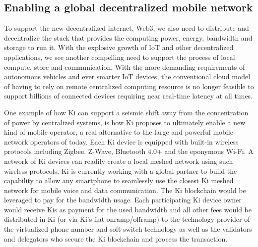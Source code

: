 \subsection{Enabling a global decentralized mobile network}
\label{sec:kiecosystemmobile}
To support the new decentralized internet, Web3, we also need to distribute and decentralize the stack that provides the computing power, energy, bandwidth and storage to run it. With the explosive growth of IoT and other decentralized applications, we see another compelling need to support the process of local compute, store and communication. With the more demanding requirements of autonomous vehicles and ever smarter IoT devices, the conventional cloud model of having to rely on remote centralized computing resource is no longer feasible to support billions of connected devices requiring near real-time latency at all times.

One example of how Ki can support a seismic shift away from the concentration of power by centralized systems, is how Ki proposes to ultimately enable a new kind of mobile operator, a real alternative to the large and powerful mobile network operators of today. Each Ki device is equipped with built-in wireless protocols including Zigbee, Z-Wave, Bluetooth 4.0+ and the eponymous Wi-Fi. A network of Ki devices can readily create a local meshed network using such wireless protocols. Ki is currently working with a global partner to build the capability to allow any smartphone to seamlessly use the closest Ki meshed network for mobile voice and data communication. The Ki blockchain would be leveraged to pay for the bandwidth usage. Each participating Ki device owner would receive Kis as payment for the used bandwidth and all other fees would be distributed in Ki (or via Ki's fiat onramp/offramp) to the technology provider of the virtualized phone number and soft-switch technology as well as the validators and delegators who secure the Ki blockchain and process the transaction.

